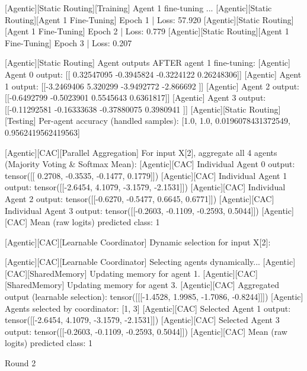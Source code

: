 [Agentic][Static Routing][Training] Agent 1 fine-tuning ...
[Agentic][Static Routing][Agent 1 Fine-Tuning] Epoch 1 | Loss: 57.920
[Agentic][Static Routing][Agent 1 Fine-Tuning] Epoch 2 | Loss: 0.779
[Agentic][Static Routing][Agent 1 Fine-Tuning] Epoch 3 | Loss: 0.207

[Agentic][Static Routing] Agent outputs AFTER agent 1 fine-tuning:
[Agentic] Agent 0 output: [[ 0.32547095 -0.3945824  -0.3224122   0.26248306]]
[Agentic] Agent 1 output: [[-3.2469406  5.320299  -3.9492772 -2.866692 ]]
[Agentic] Agent 2 output: [[-0.6492799 -0.5023901  0.5545643  0.6361817]]
[Agentic] Agent 3 output: [[-0.11292581 -0.16333638 -0.37880075  0.3980941 ]]
[Agentic][Static Routing][Testing] Per-agent accuracy (handled samples): [1.0, 1.0, 0.0196078431372549, 0.9562419562419563]

[Agentic][CAC][Parallel Aggregation] For input X[2], aggregate all 4 agents (Majority Voting & Softmax Mean):
[Agentic][CAC] Individual Agent 0 output: tensor([[ 0.2708, -0.3535, -0.1477,  0.1779]])
[Agentic][CAC] Individual Agent 1 output: tensor([[-2.6454,  4.1079, -3.1579, -2.1531]])
[Agentic][CAC] Individual Agent 2 output: tensor([[-0.6270, -0.5477,  0.6645,  0.6771]])
[Agentic][CAC] Individual Agent 3 output: tensor([[-0.2603, -0.1109, -0.2593,  0.5044]])
[Agentic][CAC] Mean (raw logits) predicted class: 1

[Agentic][CAC][Learnable Coordinator] Dynamic selection for input X[2]:

[Agentic][CAC][Learnable Coordinator] Selecting agents dynamically...
[Agentic][CAC][SharedMemory] Updating memory for agent 1.
[Agentic][CAC][SharedMemory] Updating memory for agent 3.
[Agentic][CAC] Aggregated output (learnable selection): tensor([[[-1.4528,  1.9985, -1.7086, -0.8244]]])
[Agentic] Agents selected by coordinator: [1, 3]
[Agentic][CAC] Selected Agent 1 output: tensor([[-2.6454,  4.1079, -3.1579, -2.1531]])
[Agentic][CAC] Selected Agent 3 output: tensor([[-0.2603, -0.1109, -0.2593,  0.5044]])
[Agentic][CAC] Mean (raw logits) predicted class: 1

Round 2


